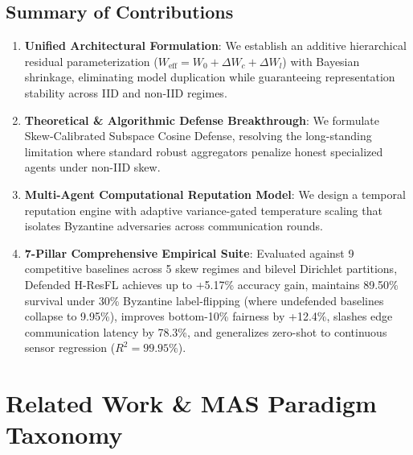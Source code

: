 \documentclass[sigconf]{acmart}
\begin{document}
\subsection{Summary of Contributions}
\begin{enumerate}
    \item \textbf{Unified Architectural Formulation}: We establish an additive hierarchical residual parameterization ($W_{\text{eff}} = W_0 + \Delta W_c + \Delta W_l$) with Bayesian shrinkage, eliminating model duplication while guaranteeing representation stability across IID and non-IID regimes.
    \item \textbf{Theoretical & Algorithmic Defense Breakthrough}: We formulate Skew-Calibrated Subspace Cosine Defense, resolving the long-standing limitation where standard robust aggregators penalize honest specialized agents under non-IID skew.
    \item \textbf{Multi-Agent Computational Reputation Model}: We design a temporal reputation engine with adaptive variance-gated temperature scaling that isolates Byzantine adversaries across communication rounds.
    \item \textbf{7-Pillar Comprehensive Empirical Suite}: Evaluated against 9 competitive baselines across 5 skew regimes and bilevel Dirichlet partitions, Defended H-ResFL achieves up to +5.17\% accuracy gain, maintains 89.50\% survival under 30\% Byzantine label-flipping (where undefended baselines collapse to 9.95\%), improves bottom-10\% fairness by +12.4\%, slashes edge communication latency by 78.3\%, and generalizes zero-shot to continuous sensor regression ($R^2 = 99.95\%$).
\end{enumerate}

\section{Related Work \& MAS Paradigm Taxonomy}
\end{document}
